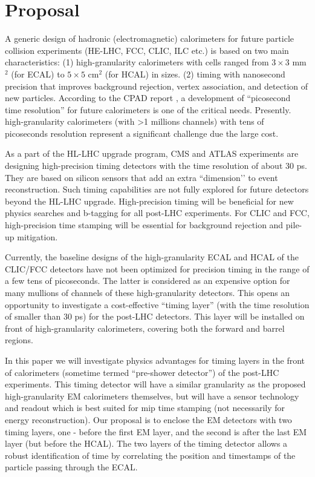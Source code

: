 \documentclass[final,1p,11pt]{elsarticle}
\begin{document}
\section{Proposal}

A generic design of hadronic (electromagnetic) calorimeters for future particle collision experiments (HE-LHC, FCC, CLIC, ILC etc.) 
is based on two main characteristics: (1) high-granularity calorimeters with cells ranged from $3\times 3$ mm$^2$ (for ECAL) to $5\times 5$ cm$^2$  (for HCAL) in sizes.
(2) timing with nanosecond precision that improves background rejection, vertex association, and detection of new particles. 
According to the CPAD report \cite{Ahmed:2019sim}, a development of “picosecond time resolution” for future calorimeters is one of the critical needs. 
Presently. high-granularity calorimeters (with >1 millions channels) with tens of picoseconds resolution represent a 
significant challenge due the large cost.

As a part of the HL-LHC upgrade program, CMS and ATLAS experiments are designing high-precision timing detectors with the time resolution of about 30 ps. 
They are based on silicon sensors that add an extra ``dimension’’ to event reconstruction. 
Such timing capabilities are not fully explored for future detectors beyond the HL-LHC upgrade. 
High-precision timing will be beneficial for new physics searches and b-tagging for all post-LHC experiments. 
For CLIC and FCC, high-precision time stamping will be essential for background rejection and pile-up mitigation. 

Currently, the baseline designs of the high-granularity ECAL and HCAL of the CLIC/FCC detectors have not been 
optimized for precision timing in the range of a few tens of picoseconds. 
The latter is considered as an expensive option for many mullions of channels of these high-granularity detectors. 
This opens an opportunity to investigate a cost-effective “timing layer” (with the time resolution of smaller than 30 ps) for the post-LHC detectors. 
This layer will be installed on front of high-granularity calorimeters, covering both the forward and barrel regions.

In this paper we  will investigate physics advantages for timing layers in the front of calorimeters (sometime termed “pre-shower detector”) 
of the post-LHC experiments. This timing detector will have a similar granularity as the proposed high-granularity EM calorimeters themselves, 
but will have a sensor technology and readout which is best suited for mip time stamping (not necessarily for energy reconstruction). 
Our proposal is to enclose the EM detectors with two timing layers, one - before the first EM layer, and the second is after the last EM layer (but before
the HCAL). The two layers of the timing detector allows a robust identification of time by correlating the position and timestamps of the particle passing through
the ECAL.
\end{document}
